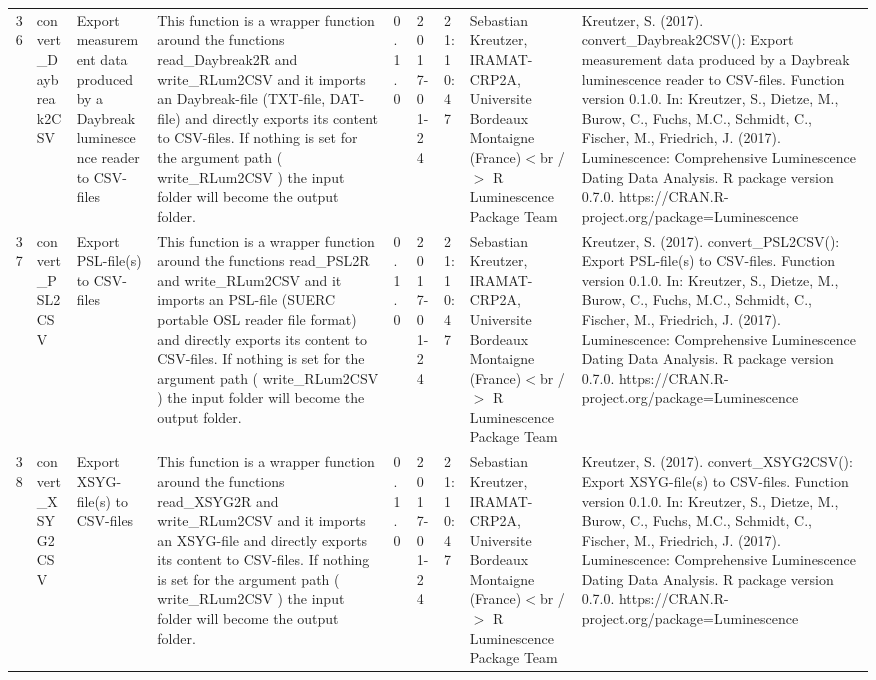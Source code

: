 \begin{table}[ht]
\begin{tabular}{rllllllll}
 \\ 
  36 & convert\_Daybreak2CSV & Export measurement data produced by a Daybreak luminescence reader to CSV-files & This function is a wrapper function around the functions  read\_Daybreak2R  and write\_RLum2CSV  and it imports an Daybreak-file (TXT-file, DAT-file) and directly exports its content to CSV-files.  If nothing is set for the argument  path  ( write\_RLum2CSV ) the input folder will become the output folder. & 0.1.0 & 2017-01-24 & 21:10:47
 & Sebastian Kreutzer, IRAMAT-CRP2A, Universite Bordeaux Montaigne (France)$<$br /$>$  R Luminescence Package Team & Kreutzer, S. (2017). convert\_Daybreak2CSV(): Export measurement data produced by a Daybreak luminescence reader to CSV-files. Function version 0.1.0. In: Kreutzer, S., Dietze, M., Burow, C., Fuchs, M.C., Schmidt, C., Fischer, M., Friedrich, J. (2017). Luminescence: Comprehensive Luminescence Dating Data Analysis. R package version 0.7.0. https://CRAN.R-project.org/package=Luminescence
 \\ 
  37 & convert\_PSL2CSV & Export PSL-file(s) to CSV-files & This function is a wrapper function around the functions  read\_PSL2R  and write\_RLum2CSV  and it imports an PSL-file (SUERC portable OSL reader file format) and directly exports its content to CSV-files. If nothing is set for the argument  path  ( write\_RLum2CSV ) the input folder will become the output folder. & 0.1.0 & 2017-01-24 & 21:10:47
 & Sebastian Kreutzer, IRAMAT-CRP2A, Universite Bordeaux Montaigne (France)$<$br /$>$  R Luminescence Package Team & Kreutzer, S. (2017). convert\_PSL2CSV(): Export PSL-file(s) to CSV-files. Function version 0.1.0. In: Kreutzer, S., Dietze, M., Burow, C., Fuchs, M.C., Schmidt, C., Fischer, M., Friedrich, J. (2017). Luminescence: Comprehensive Luminescence Dating Data Analysis. R package version 0.7.0. https://CRAN.R-project.org/package=Luminescence
 \\ 
  38 & convert\_XSYG2CSV & Export XSYG-file(s) to CSV-files & This function is a wrapper function around the functions  read\_XSYG2R  and write\_RLum2CSV  and it imports an XSYG-file and directly exports its content to CSV-files. If nothing is set for the argument  path  ( write\_RLum2CSV ) the input folder will become the output folder. & 0.1.0 & 2017-01-24 & 21:10:47
 & Sebastian Kreutzer, IRAMAT-CRP2A, Universite Bordeaux Montaigne (France)$<$br /$>$  R Luminescence Package Team & Kreutzer, S. (2017). convert\_XSYG2CSV(): Export XSYG-file(s) to CSV-files. Function version 0.1.0. In: Kreutzer, S., Dietze, M., Burow, C., Fuchs, M.C., Schmidt, C., Fischer, M., Friedrich, J. (2017). Luminescence: Comprehensive Luminescence Dating Data Analysis. R package version 0.7.0. https://CRAN.R-project.org/package=Luminescence

\end{tabular}
\end{table}
